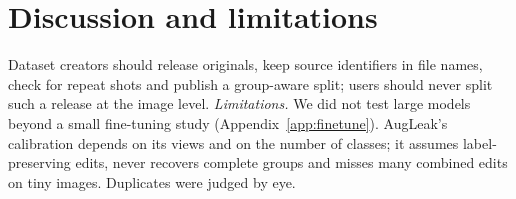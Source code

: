 \section{Discussion and limitations}
\label{sec:discussion}

Dataset creators should release originals, keep source identifiers in file names, check for repeat shots and publish a group-aware split; users should never split such a release at the image level. \emph{Limitations.} We did not test large models beyond a small fine-tuning study (Appendix~\ref{app:finetune}). AugLeak's calibration depends on its views and on the number of classes; it assumes label-preserving edits, never recovers complete groups and misses many combined edits on tiny images. Duplicates were judged by eye.
